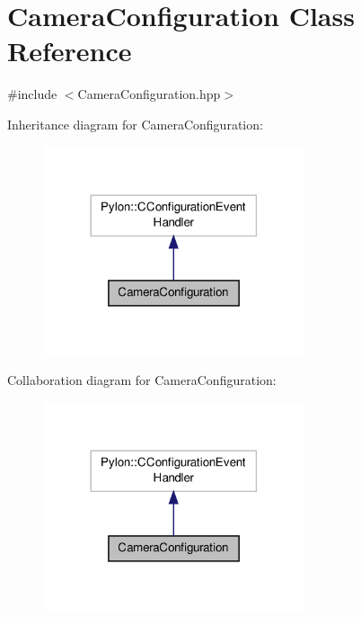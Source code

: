 \hypertarget{class_camera_configuration}{\section{Camera\-Configuration Class Reference}
\label{class_camera_configuration}
}


{\ttfamily \#include $<$Camera\-Configuration.\-hpp$>$}



Inheritance diagram for Camera\-Configuration\-:
\nopagebreak
\begin{figure}[H]
\begin{center}
\leavevmode
\includegraphics[width=218pt]{class_camera_configuration__inherit__graph}
\end{center}
\end{figure}


Collaboration diagram for Camera\-Configuration\-:
\nopagebreak
\begin{figure}[H]
\begin{center}
\leavevmode
\includegraphics[width=218pt]{class_camera_configuration__coll__graph}
\end{center}
\end{figure}
